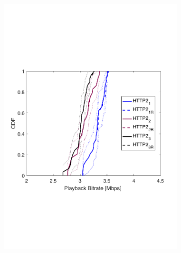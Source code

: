 \begin{figure}[t!]
\centering
\begin{subfigure}[t]{0.33\textwidth}
   \captionsetup{justification=centering,margin=4.5cm}
    \includegraphics[trim={0 7cm 0 7cm}, scale=0.25]{figures/CDF_bitrat_squad_parallel_http2_nd18.pdf}
     \caption{}
    \label{fig:phttp2bitrate}
  \end{subfigure}
  \begin{subfigure}[t]{0.33\textwidth}
  \captionsetup{justification=raggedright,singlelinecheck=false,margin=2.5cm}

\end{subfigure}
\end{figure}
